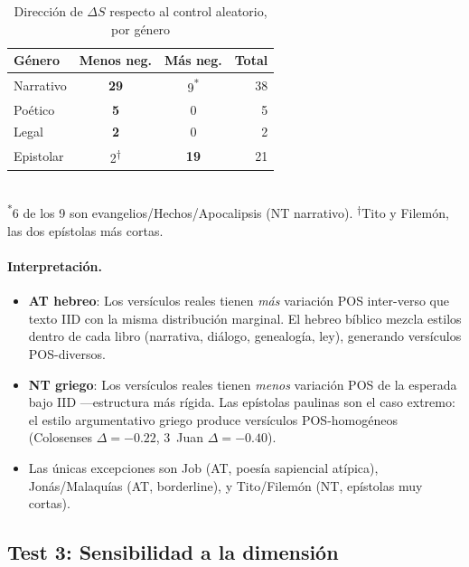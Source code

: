 \documentclass[12pt,a4paper]{article}
\newcommand{\val}[1]{\textcolor{hlcolor}{\textbf{#1}}}
\begin{document}
\begin{table}[H]
\centering
\caption{Direcci\'on de $\Delta S$ respecto al control aleatorio, por g\'enero}
\label{tab:direction_genre}
\begin{tabular}{lccr}
\toprule
\textbf{G\'enero} & \textbf{Menos neg.} & \textbf{M\'as neg.} & \textbf{Total} \\
\midrule
Narrativo   & \val{29} & 9\textsuperscript{*}  & 38 \\
Po\'etico   & \val{5}  & 0   & 5 \\
Legal       & \val{2}  & 0   & 2 \\
Epistolar   & 2\textsuperscript{$\dagger$} & \val{19} & 21 \\
\bottomrule
\end{tabular}\\[0.3em]
{\small \textsuperscript{*}6 de los 9 son evangelios/Hechos/Apocalipsis (NT narrativo).
\textsuperscript{$\dagger$}Tito y Filem\'on, las dos ep\'istolas m\'as cortas.}
\end{table}

\paragraph{Interpretaci\'on.}
\begin{itemize}[leftmargin=2em]
\item \textbf{AT hebreo}: Los vers\'iculos reales tienen \emph{m\'as} variaci\'on POS
      inter-verso que texto IID con la misma distribuci\'on marginal.
      El hebreo b\'iblico mezcla estilos dentro de cada libro (narrativa, di\'alogo,
      genealog\'ia, ley), generando vers\'iculos POS-diversos.
\item \textbf{NT griego}: Los vers\'iculos reales tienen \emph{menos} variaci\'on POS
      de la esperada bajo IID ---estructura m\'as r\'igida.
      Las ep\'istolas paulinas son el caso extremo: el estilo argumentativo griego
      produce vers\'iculos POS-homog\'eneos
      (Colosenses $\Delta = -0.22$, 3~Juan $\Delta = -0.40$).
\item Las \'unicas excepciones son Job (AT, poes\'ia sapiencial at\'ipica),
      Jon\'as/Malaqu\'ias (AT, borderline), y Tito/Filem\'on (NT, ep\'istolas muy cortas).
\end{itemize}

\subsection{Test 3: Sensibilidad a la dimensi\'on}
\end{document}
